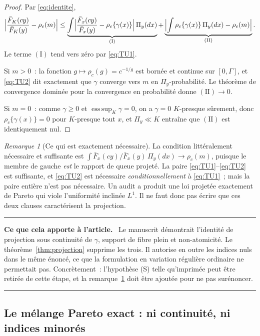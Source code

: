 \documentclass[11pt]{article}
\theoremstyle{plain}
\theoremstyle{definition}
\theoremstyle{remark}
\newtheorem{remarque}[theoreme]{Remarque}
\DeclareMathOperator*{\esssup}{ess\,sup}
\newcommand{\1}{\mathbf 1}
\newenvironment{apport}
  {\par\medskip\noindent\begingroup\color{bleu}\rule{\linewidth}{0.6pt}\par
   \nobreak\vspace{2pt}\noindent\textbf{Ce que cela apporte à l'article.}\ \normalcolor}
  {\par\vspace{2pt}\noindent\textcolor{bleu}{\rule{\linewidth}{0.6pt}}\endgroup\par\medskip}
\begin{document}
\begin{proof}
Par \eqref{eq:identite},
\[
 \Bigl|\frac{\bar F_K(cy)}{\bar F_K(y)}-\rho_c(m)\Bigr|
 \le
 \underbrace{\int\Bigl|\frac{\bar F_x(cy)}{\bar F_x(y)}
   -\rho_c\{\gamma(x)\}\Bigr|\,\Pi_y(dx)}_{(\mathrm I)}
 +\underbrace{\Bigl|\int\rho_c\{\gamma(x)\}\,\Pi_y(dx)-\rho_c(m)
   \Bigr|}_{(\mathrm{II})}.
\]
Le terme $(\mathrm I)$ tend vers zéro par \eqref{eq:TU1}.

Si $m>0$~: la fonction $g\mapsto\rho_c(g)=c^{-1/g}$ est bornée et
continue sur $[0,\Gamma]$, et \eqref{eq:TU2} dit exactement que $\gamma$
converge vers $m$ en $\Pi_y$-probabilité. Le théorème de convergence
dominée pour la convergence en probabilité donne
$(\mathrm{II})\to0$.

Si $m=0$~: comme $\gamma\ge0$ et $\esssup_K\gamma=0$, on a $\gamma=0$
$K$-presque sûrement, donc $\rho_c\{\gamma(x)\}=0$ pour $K$-presque tout
$x$, et $\Pi_y\ll K$ entraîne que $(\mathrm{II})$ est identiquement
nul.
\end{proof}

\begin{remarque}[Ce qui est exactement nécessaire]
\label{rem:exactitude-projection}
La condition littéralement nécessaire et suffisante est
$\int \bar F_x(cy)/\bar F_x(y)\,\Pi_y(dx)\to\rho_c(m)$, puisque le membre
de gauche \emph{est} le rapport de queue projeté. La paire
\eqref{eq:TU1}--\eqref{eq:TU2} est suffisante, et \eqref{eq:TU2} est
nécessaire \emph{conditionnellement} à \eqref{eq:TU1}~; mais la paire
entière n'est pas nécessaire. Un audit a produit une loi projetée
exactement de Pareto qui viole l'uniformité inclinée $L^1$. Il ne faut
donc pas écrire que ces deux clauses caractérisent la projection.
\end{remarque}

\begin{apport}
Le manuscrit démontrait l'identité de projection sous continuité de
$\gamma$, support de fibre plein et non-atomicité. Le
théorème~\ref{thm:projection} supprime les trois. Il autorise en outre
les indices nuls dans le même énoncé, ce que la formulation en variation
régulière ordinaire ne permettait pas. Concrètement~: l'hypothèse (S)
telle qu'imprimée peut être retirée de cette étape, et la
remarque~\ref{rem:exactitude-projection} doit être ajoutée pour ne pas
surénoncer.
\end{apport}

\subsection{Le mélange Pareto exact : ni continuité, ni indices minorés}
\end{document}
